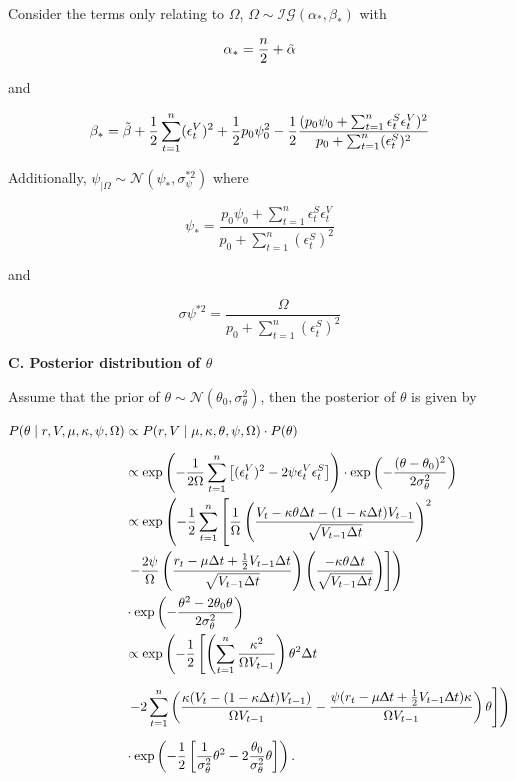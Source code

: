\documentclass[12pt,a4paper]{article}
\numberwithin{equation}{section}
\begin{document}
Consider the terms only relating to $\Omega$, $\Omega \sim \mathcal{IG}(\alpha_*, \beta_*)$ with

\[\alpha_* = \frac{n}{2} + \Tilde{\alpha}\] 

and 

\[\beta_* = \Tilde{\beta} + \frac{1}{2} \sum_{t=1}^n (\epsilon_t^V)^2 + \frac{1}{2} p_0 \psi_0^2 - \frac{1}{2} \frac{(p_0 \psi_0 + \sum_{t=1}^n \epsilon_t^S \epsilon_t^V)^2}{p_0 + \sum_{t=1}^n (\epsilon_t^S )^2} \] 

Additionally, $\psi_{|\Omega} \sim \mathcal{N} (\psi_*, \sigma_\psi^{*2})$ where

\[\psi_* =\frac{p_0 \psi_0 + \sum_{t=1}^n \epsilon_t^S \epsilon_t^V}{p_0 + \sum_{t=1}^n (\epsilon_t^S )^2} \]

and 

\[\sigma\psi^{*2} = \frac{\Omega}{p_0 + \sum_{t=1}^n (\epsilon_t^S)^2 }\]

\vspace{1em}

\textbf{C. Posterior distribution of $\theta$}

\vspace{1em}

Assume that the prior of $\theta \sim \mathcal{N}(\theta_0, \sigma_\theta^2)$, then the posterior of $\theta$ is given by

\begin{align*}
P(\theta \mid r, V, \mu, \kappa, \psi, \Omega) & \propto P(r, V \mid \mu, \kappa, \theta, \psi, \Omega) \cdot P(\theta) \\[0.6em]
& \propto \exp\left( -\frac{1}{2\Omega} \sum_{t=1}^{n} \left[ (\epsilon_t^V)^2 - 2\psi \epsilon_t^V \epsilon_t^S \right] \right) \cdot \exp\left( -\frac{(\theta - \theta_0)^2}{2\sigma_\theta^2} \right)\\
& \propto \exp\left( -\frac{1}{2} \sum_{t=1}^{n} \left[ \frac{1}{\Omega} \left( \frac{V_t - \kappa \theta \Delta t - (1 - \kappa \Delta t)V_{t-1}}{\sqrt{V_{t-1} \Delta t}} \right)^2 \right. \right. \\
& \left. \left. - \frac{2\psi}{\Omega} \left( \frac{r_t - \mu \Delta t + \frac{1}{2} V_{t-1} \Delta t}{\sqrt{V_{t-1} \Delta t}} \right) \left( \frac{-\kappa \theta \Delta t}{\sqrt{V_{t-1} \Delta t}} \right) \right] \right) \\
& \cdot \exp\left( -\frac{\theta^2 - 2\theta_0 \theta}{2\sigma_\theta^2} \right)\\
& \propto\exp\left(-\frac{1}{2} \left[\left(\sum_{t=1}^n \frac{\kappa^2}{\Omega V_{t-1}}\right) \theta^2 \Delta t \right. \right. \\[0.6em] 
& \left. \left. - 2\sum_{t=1}^n \left(\frac{\kappa (V_t - (1-\kappa \Delta t) V_{t-1})}{\Omega V_{t-1}} - \frac{\psi (r_t -\mu \Updelta t + \frac{1}{2} V_{t-1} \Updelta t) \kappa}{\Omega V_{t-1}} \right) \theta \right] \right) \\[0.6em]
& \cdot \exp\left(-\frac{1}{2} \left[\frac{1}{\sigma_\theta^2} \theta^2 - 2 \frac{\theta_0}{\sigma_\theta^2} \theta \right] \right).
\end{align*}
\end{document}
